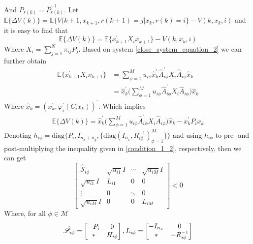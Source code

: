 \documentclass[conference]{IEEEtran}
\begin{document}
And $P_{r(k)}=\bar{P}^{-1}_{r(k)}$. Let $\mathbb{E}\{\varDelta V(k)\}=\mathbb{E}\{V(k+1,x_{k+1},r(k+1)=j|x_k,r(k)=i \}-V(k,x_k,i)$ and it is easy to find that
\begin{equation} \label{lypfunction}
	\mathbb{E}\{\varDelta V(k)\}=\mathbb{E}\{x^{'}_{k+1}X_{i} x_{k+1} \}-V(k,x_k,i)
\end{equation} 
Where $X_{i} = \sum_{j=1}^{N}\pi_{ij}P_{j}$. Based on system \eqref{close_system_equation_2} we can further obtain \\
\begin{equation}
	\begin{split}
		\mathbb{E}\{x^{'}_{k+1}X_{i} x_{k+1} \}& = \sum_{\phi=1}^{M} u_{i\phi} \hat{x}^{'}_{k} \hat{A}^{'}_{i\phi}X_{i}\hat{A}_{i\phi}\hat{x}_{k}\\
		&=\hat{x}^{'}_{k} \Big( \sum_{\phi=1}^{M}u_{i\phi}\hat{A}^{'}_{i\phi}X_{i}\hat{A}_{i\phi}\Big) \hat{x}_{k} 
	\end{split}
\end{equation}
Where $\hat{x}_{k}=(x^{'}_k,\varphi^{'}_{i}(C_{i}x_{k}))^{'}$. Which implies
\begin{equation} \label{leq18}
	\begin{split}
		\mathbb{E}\{\varDelta V(k)\}=\hat{x}^{'}_{k} \Big( \sum_{\phi=1}^{M}u_{i\phi}\hat{A}^{'}_{i\phi}X_{i}\hat{A}_{i\phi}\Big) \hat{x}_{k} -x^{'}_{k}P_{i}x_{k}
	\end{split}
\end{equation}
Denoting $h_{i\phi} = \mathrm{diag}\{P_{i}, I_{n_x+n_y},\{\mathrm{diag}(I_{n_x},R^{-1}_{i\phi})^{M}_{\phi=1} \} \}$ and using $h_{i\phi}$ to pre- and post-multiplying the inequality given in \eqref{condition_1_2}, respectively, then we can get \\
\begin{equation}\nonumber
\begin{bmatrix} 
	\hat{\mathscr{S}}_{i\phi}&
\sqrt{u_{i1}}I&
\cdots&
\sqrt{u_{iM}}I\\
\sqrt{u_{i1}}I&L_{i1}&0&0\\ 
\vdots&0&\ddots&0\\
\sqrt{u_{iM}}I&0&0&
L_{iM}

\end{bmatrix} <0
\end{equation}
Where, for all $\phi\in\mathcal{M}$
\begin{equation} \notag
	\begin{aligned}
		\hat{\mathscr{S}}_{i\phi}=\begin{bmatrix}
			-P_{i }&0\\
			*&H_{i\phi}
		\end{bmatrix},
		L_{i\phi} = \begin{bmatrix}
			-I_{n_x}&0\\
			*&-R^{-1}_{i\phi}
		\end{bmatrix}
	\end{aligned}
\end{equation}
\end{document}
